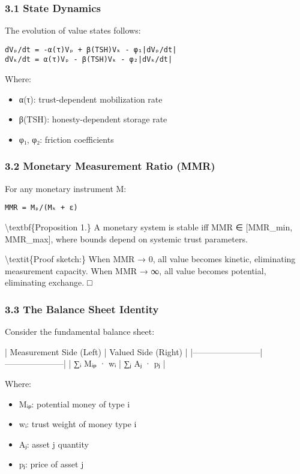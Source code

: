 \documentclass[11pt,oneside]{book}
\begin{document}
\subsubsection{3.1 State Dynamics}

The evolution of value states follows:

\begin{verbatim}
dVₚ/dt = -α(τ)Vₚ + β(TSH)Vₖ - φ₁|dVₚ/dt|
dVₖ/dt = α(τ)Vₚ - β(TSH)Vₖ - φ₂|dVₖ/dt|
\end{verbatim}

Where:
\begin{itemize}
\item α(τ): trust-dependent mobilization rate
\item β(TSH): honesty-dependent storage rate  
\item φ₁, φ₂: friction coefficients
\end{itemize}

\subsubsection{3.2 Monetary Measurement Ratio (MMR)}

For any monetary instrument M:

\begin{verbatim}
MMR = Mₚ/(Mₖ + ε)
\end{verbatim}

\textbackslash textbf\{Proposition 1.\} A monetary system is stable iff MMR ∈ [MMR\_min, MMR\_max], where bounds depend on systemic trust parameters.

\textbackslash textit\{Proof sketch:\} When MMR → 0, all value becomes kinetic, eliminating measurement capacity. When MMR → ∞, all value becomes potential, eliminating exchange. □

\subsubsection{3.3 The Balance Sheet Identity}

Consider the fundamental balance sheet:

| Measurement Side (Left) | Valued Side (Right) |
|------------------------|---------------------|
| ∑ᵢ Mᵢₚ · wᵢ | ∑ⱼ Aⱼ · pⱼ |

Where:
\begin{itemize}
\item Mᵢₚ: potential money of type i
\item wᵢ: trust weight of money type i
\item Aⱼ: asset j quantity
\item pⱼ: price of asset j
\end{itemize}
\end{document}
